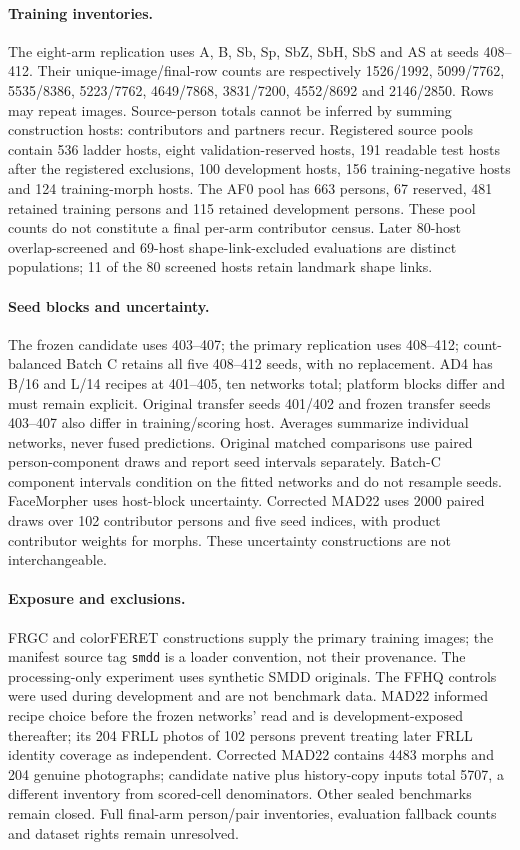 \paragraph{Training inventories.}
The eight-arm replication uses A, B, Sb, Sp, SbZ, SbH, SbS and AS at seeds 408--412. Their unique-image/final-row counts are respectively 1526/1992, 5099/7762, 5535/8386, 5223/7762, 4649/7868, 3831/7200, 4552/8692 and 2146/2850. Rows may repeat images. Source-person totals cannot be inferred by summing construction hosts: contributors and partners recur. Registered source pools contain 536 ladder hosts, eight validation-reserved hosts, 191 readable test hosts after the registered exclusions, 100 development hosts, 156 training-negative hosts and 124 training-morph hosts. The AF0 pool has 663 persons, 67 reserved, 481 retained training persons and 115 retained development persons. These pool counts do not constitute a final per-arm contributor census. Later 80-host overlap-screened and 69-host shape-link-excluded evaluations are distinct populations; 11 of the 80 screened hosts retain landmark shape links.

\paragraph{Seed blocks and uncertainty.}
The frozen candidate uses 403--407; the primary replication uses 408--412; count-balanced Batch C retains all five 408--412 seeds, with no replacement. AD4 has B/16 and L/14 recipes at 401--405, ten networks total; platform blocks differ and must remain explicit. Original transfer seeds 401/402 and frozen transfer seeds 403--407 also differ in training/scoring host. Averages summarize individual networks, never fused predictions. Original matched comparisons use paired person-component draws and report seed intervals separately. Batch-C component intervals condition on the fitted networks and do not resample seeds. FaceMorpher uses host-block uncertainty. Corrected MAD22 uses 2000 paired draws over 102 contributor persons and five seed indices, with product contributor weights for morphs. These uncertainty constructions are not interchangeable.

\paragraph{Exposure and exclusions.}
FRGC and colorFERET constructions supply the primary training images; the manifest source tag \texttt{smdd} is a loader convention, not their provenance. The processing-only experiment uses synthetic SMDD originals. The FFHQ controls were used during development and are not benchmark data. MAD22 informed recipe choice before the frozen networks' read and is development-exposed thereafter; its 204 FRLL photos of 102 persons prevent treating later FRLL identity coverage as independent. Corrected MAD22 contains 4483 morphs and 204 genuine photographs; candidate native plus history-copy inputs total 5707, a different inventory from scored-cell denominators. Other sealed benchmarks remain closed. Full final-arm person/pair inventories, evaluation fallback counts and dataset rights remain unresolved.

